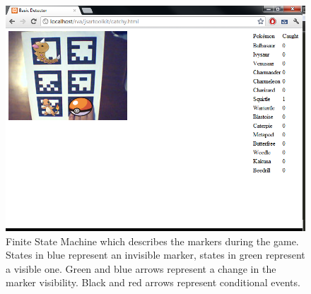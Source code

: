 \begin{figure}
	\begin{center}
		\includegraphics[width=\columnwidth]{report/images/catchy.png}
	\end{center}
	\caption[Marker States]{Finite State Machine which describes the markers during the game. States in blue represent an invisible marker, states in green represent a visible one. Green and blue arrows represent a change in the marker visibility. Black and red arrows represent conditional events.}
	\label{fig:catchy}
\end{figure}



